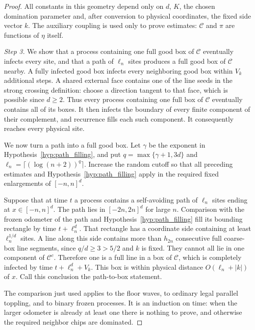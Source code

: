 \documentclass[12pt]{amsart}
\begin{document}
\begin{proof}
All constants in this geometry depend only on $d$, $K$, the chosen domination parameter and, after conversion to physical coordinates, the fixed side vector $k$. The auxiliary coupling is used only to prove estimates: $\mathcal C$ and $\pi$ are functions of $\eta$ itself.

\emph{Step 3.} We show that a process containing one full good box of $\mathcal C$ eventually infects every site, and that a path of $\ell_n$ sites produces a full good box of $\mathcal C$ nearby. A fully infected good box infects every neighboring good box within $V_k$ additional steps. A shared external face contains one of the line seeds in the strong crossing definition: choose a direction tangent to that face, which is possible since $d\geq2$. Thus every process containing one full box of $\mathcal C$ eventually contains all of its boxes. It then infects the boundary of every finite component of their complement, and recurrence fills each such component. It consequently reaches every physical site.

We now turn a path into a full good box. Let $\gamma$ be the exponent in Hypothesis~\ref{hyp:path_filling}, and put $q=\max\{\gamma+1,3d\}$ and $\ell_n=\lceil(\log(n+2))^q\rceil$. Increase the random cutoff so that all preceding estimates and Hypothesis~\ref{hyp:path_filling} apply in the required fixed enlargements of $[-n,n]^d$.

Suppose that at time $t$ a process contains a self-avoiding path of $\ell_n$ sites ending at $x\in[-n,n]^d$. The path lies in $[-2n,2n]^d$ for large $n$. Comparison with the frozen odometer of the path and Hypothesis~\ref{hyp:path_filling} fill its bounding rectangle by time $t+\ell_n^d$. That rectangle has a coordinate side containing at least $\ell_n^{1/d}$ sites. A line along this side contains more than $h_{2n}$ consecutive full coarse-box line segments, since $q/d\geq3>5/2$ and $k$ is fixed. They cannot all lie in one component of $\mathcal C^c$. Therefore one is a full line in a box of $\mathcal C$, which is completely infected by time $t+\ell_n^d+V_k$. This box is within physical distance $O(\ell_n+|k|)$ of $x$. Call this conclusion the path-to-box statement.

The comparison just used applies to the floor waves, to ordinary legal parallel toppling, and to binary frozen processes. It is an induction on time: when the larger odometer is already at least one there is nothing to prove, and otherwise the required neighbor chips are dominated.


\end{proof}
\end{document}
